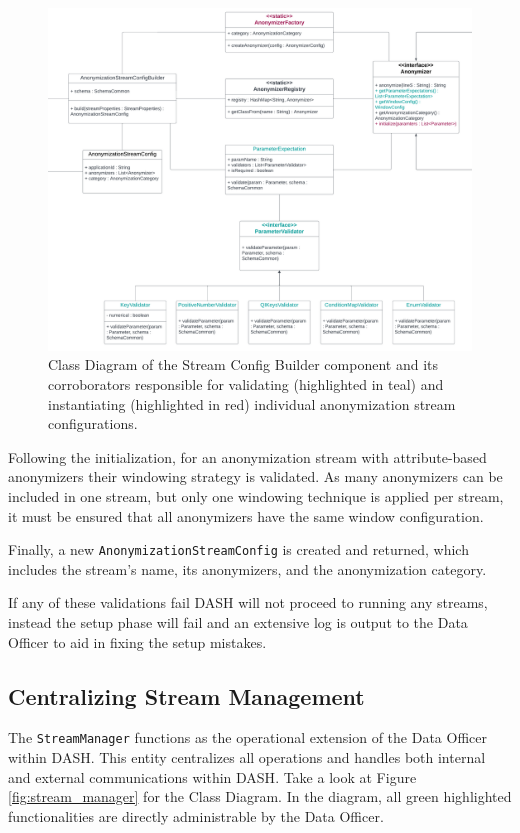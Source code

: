 \begin{figure}[H]
   \begin{adjustbox}{center}
   \includegraphics[width=0.85\pdfpagewidth]{img/Stream_Config_Builder.pdf}
   \end{adjustbox}
   \caption{Class Diagram of the Stream Config Builder component and its corroborators responsible for validating (highlighted in teal) and instantiating (highlighted in red) individual anonymization stream configurations.\label{fig:stream_config_builder}}
\end{figure}

Following the initialization, for an anonymization stream with attribute-based anonymizers their windowing strategy is validated. As many anonymizers can be included in one stream, but only one windowing technique is applied per stream, it must be ensured that all anonymizers have the same window configuration. \par
Finally, a new \texttt{AnonymizationStreamConfig} is created and returned, which includes the stream's name, its anonymizers, and the anonymization category. \par
If any of these validations fail \ac{DASH} will not proceed to running any streams, instead the setup phase will fail and an extensive log is output to the Data Officer to aid in fixing the setup mistakes. 

\subsection{Centralizing Stream Management}
The \texttt{StreamManager} functions as the operational extension of the Data Officer within \ac{DASH}. This entity centralizes all operations and handles both internal and external communications within \ac{DASH}. Take a look at Figure \ref{fig:stream_manager} for the Class Diagram. In the diagram, all green highlighted functionalities are directly administrable by the Data Officer. 

